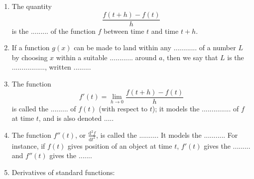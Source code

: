 \documentclass{article}
\newcommand{\deriv}[3][]{\frac{\mathrm{d}^{#1} #2}{\mathrm{d}#3^{#1}}}
\begin{document}
\begin{enumerate}
	\item The quantity
		\[\frac{f(t+h)-f(t)}{h}\]
		is the ......... of the function $f$ between time $t$ and time $t+h$.
	\item If a function $g(x)$ can be made to land within any ............ of a number $L$ by choosing $x$ within a suitable ............ around $a$, then we say that $L$ is the ................., written .........
	\item The function
		\[f'(t)=\lim_{h\to 0}\frac{f(t+h)-f(t)}{h}\]
		is called the ......... of $f(t)$ (with respect to $t$); it models the ............... of $f$ at time $t$, and is also denoted .....
	\item The function $f''(t)$, or $\deriv[2]{f}{t}$, is called the .......... It models the ........... For instance, if $f(t)$ gives position of an object at time $t$, $f'(t)$ gives the ......... and $f''(t)$ gives the .......
	\item Derivatives of standard functions:


\end{enumerate}
\end{document}
